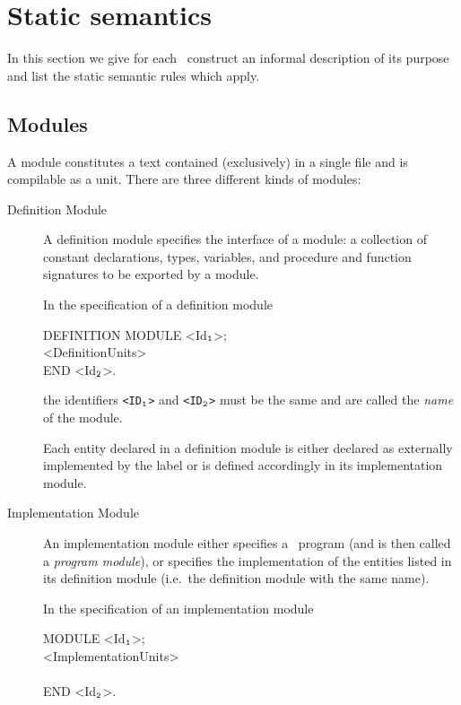 \section{Static semantics}

In this section we give for each \Booster\ construct an informal
description of its purpose and list the static semantic rules which
apply.

\subsection*{Modules}

A module constitutes a text contained (exclusively) in a single file
and is compilable as a unit. There are three different kinds of
modules:

\begin{description}

\item[Definition Module] A definition module specifies the interface
of a module: a collection of constant declarations, types, variables,
and procedure and function signatures to be exported by a module.

In the specification of a definition module

\begin{frag}
DEFINITION MODULE <Id$_{\tt 1}$>;\\
\> <DefinitionUnits>\\
END <Id$_{\tt 2}$>.
\end{frag}

the identifiers {\tt <ID$_{\tt 1}$>} and {\tt <ID$_{\tt 2}$>} must be the
same and are called the {\em name} of the module.

Each entity declared in a definition module is either declared as
externally implemented by the label  or is defined
accordingly in its implementation module.

\item[Implementation Module] An implementation module either specifies
a \Booster\ program (and is then called a {\em program module}), or
specifies the implementation of the entities listed in its definition
module (i.e.\ the definition module with the same name).

In the specification of an implementation module

\begin{frag}
[IMPLEMENTATION] MODULE <Id$_{\tt 1}$>;\\
\> <ImplementationUnits>\\
\\
END <Id$_{\tt 2}$>.
\end{frag}


\end{description}
